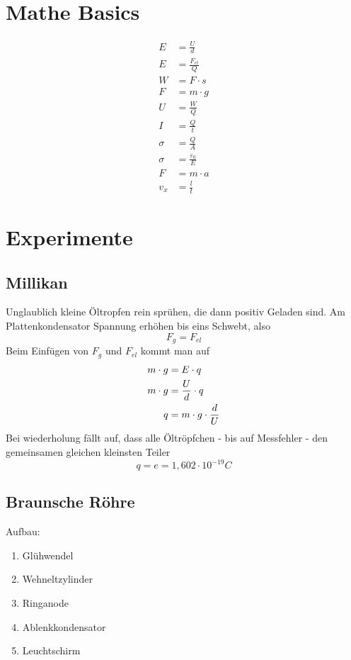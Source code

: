 \documentclass{article}
\begin{document}
\section{Mathe Basics}

\begin{align*}
    E &= \frac{U}{d} \\
    E &= \frac{F_{el}}{Q} \\
    W &= F \cdot s \\
    F &= m \cdot g \\
    U &= \frac{W}{Q} \\
    I &= \frac{Q}{t} \\
    \sigma &= \frac{Q}{A} \\
    \sigma &= \frac{\varepsilon_0}{E} \\
    F &= m \cdot a \\
    v_x &= \frac{l}{t}
\end{align*}

\section{Experimente}
\subsection{Millikan}
Unglaublich kleine Öltropfen rein sprühen, die dann positiv Geladen sind.
Am Plattenkondensator Spannung erhöhen bis eins Schwebt, also 
\[F_g=F_{el}\]
Beim Einfügen von $F_g$ und $F_{el}$ kommt man auf
\begin{align}
\setcounter{equation}{0}
    m \cdot g &= E \cdot q \\
    m \cdot g &= \frac{U}{d} \cdot q \\
    q &= m \cdot g \cdot \frac{d}{U}
\end{align}
Bei wiederholung fällt auf, dass alle Öltröpfchen - bis auf Messfehler - den gemeinsamen gleichen kleinsten Teiler
\[q=e=1,602 \cdot 10^{-19} C\]

\subsection{Braunsche Röhre}
Aufbau:
\begin{enumerate}
\item Glühwendel
\item Wehneltzylinder
\item Ringanode
\item Ablenkkondensator
\item Leuchtschirm
\end{enumerate}
\end{document}
